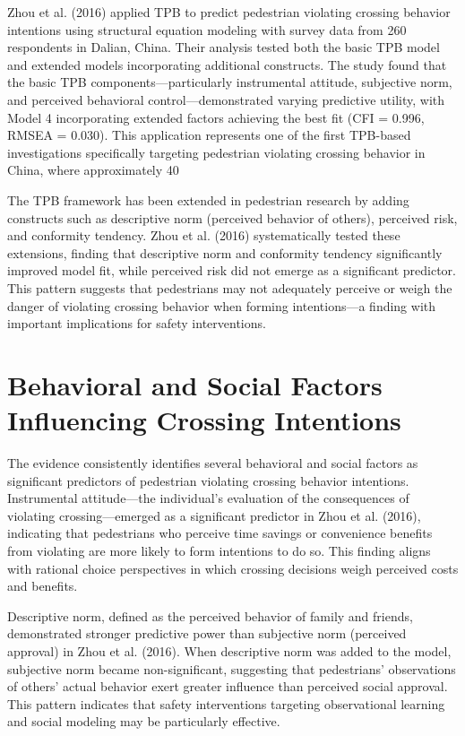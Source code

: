 \documentclass{article}
\begin{document}
Zhou et al. (2016) applied TPB to predict pedestrian violating crossing behavior intentions using structural equation modeling with survey data from 260 respondents in Dalian, China. Their analysis tested both the basic TPB model and extended models incorporating additional constructs. The study found that the basic TPB components—particularly instrumental attitude, subjective norm, and perceived behavioral control—demonstrated varying predictive utility, with Model 4 incorporating extended factors achieving the best fit (CFI = 0.996, RMSEA = 0.030). This application represents one of the first TPB-based investigations specifically targeting pedestrian violating crossing behavior in China, where approximately 40%

The TPB framework has been extended in pedestrian research by adding constructs such as descriptive norm (perceived behavior of others), perceived risk, and conformity tendency. Zhou et al. (2016) systematically tested these extensions, finding that descriptive norm and conformity tendency significantly improved model fit, while perceived risk did not emerge as a significant predictor. This pattern suggests that pedestrians may not adequately perceive or weigh the danger of violating crossing behavior when forming intentions—a finding with important implications for safety interventions. \cite{08_2016_zhou_aap}

\section{Behavioral and Social Factors Influencing Crossing Intentions}
The evidence consistently identifies several behavioral and social factors as significant predictors of pedestrian violating crossing behavior intentions. Instrumental attitude—the individual's evaluation of the consequences of violating crossing—emerged as a significant predictor in Zhou et al. (2016), indicating that pedestrians who perceive time savings or convenience benefits from violating are more likely to form intentions to do so. This finding aligns with rational choice perspectives in which crossing decisions weigh perceived costs and benefits. \cite{08_2016_zhou_aap}

Descriptive norm, defined as the perceived behavior of family and friends, demonstrated stronger predictive power than subjective norm (perceived approval) in Zhou et al. (2016). When descriptive norm was added to the model, subjective norm became non-significant, suggesting that pedestrians' observations of others' actual behavior exert greater influence than perceived social approval. This pattern indicates that safety interventions targeting observational learning and social modeling may be particularly effective. \cite{08_2016_zhou_aap}
\end{document}
